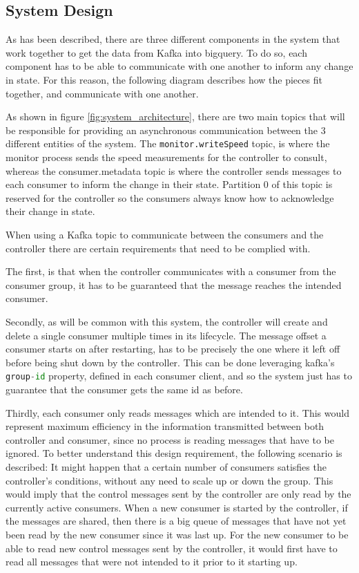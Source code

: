 \subsection{System Design}

As has been described, there are three different components in the system that
work together to get the data from Kafka into bigquery. To do so, each component
has to be able to communicate with one another to inform any change in state.
For this reason, the following diagram describes how the pieces fit together,
and communicate with one another.

As shown in figure \ref{fig:system_architecture}, there are two main topics that
will be responsible for providing an asynchronous communication between the 3
different entities of the system. The \lstinline{monitor.writeSpeed} topic, is where
the monitor process sends the speed measurements for the controller to consult,
whereas the consumer.metadata topic is where the controller sends
messages to each consumer to inform the change in their state. Partition 0 of
this topic is reserved for the controller so the consumers always know how to
acknowledge their change in state.

When using a Kafka topic to communicate between the consumers and the controller
there are certain requirements that need to be complied with. 

The first, is that when the controller communicates with a consumer from the
consumer group, it has to be guaranteed that the message reaches the intended
consumer. 

Secondly, as will be common with this system, the controller will create and
delete a single consumer multiple times in its lifecycle. The message offset a
consumer starts on after restarting, has to be precisely the one where it left
off before being shut down by the controller. This can be done leveraging
kafka's \lstinline[language=Python]{group-id} property, defined in each consumer
client, and so the system just has to guarantee that the consumer gets the same
id as before.

Thirdly, each consumer only reads messages which are intended to it. This would
represent maximum efficiency in the information transmitted between both
controller and consumer, since no process is reading messages that have to be
ignored. To better understand this design requirement, the following scenario is
described: It might happen that a certain number of consumers satisfies the
controller's conditions, without any need to scale up or down the group. This
would imply that the control messages sent by the controller are only read by
the currently active consumers. When a new consumer is started by the
controller, if the messages are shared, then there is a big queue of messages
that have not yet been read by the new consumer since it was last up. For the
new consumer to be able to read new control messages sent by the controller, it
would first have to read all messages that were not intended to it prior to it
starting up.


